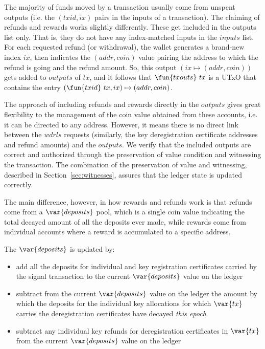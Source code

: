 \documentclass[11pt,a4paper,dvipsnames]{article}
\theoremstyle{definition}
\theoremstyle{definition}
\begin{document}
The majority of funds moved by a transaction usually come from unspent outputs
(i.e. the $(txid, ix)$ pairs in the inputs of a transaction). The claiming of
refunds and rewards works slightly differently. These get included in the outputs list
only. That is, they do not have any index-matched inputs in the $inputs$ list.
For each requested refund (or withdrawal), the
wallet generates a brand-new index $ix$, then indicates the $(addr,coin)$ value
pairing the address to which the refund is going and the refund amount.
So, this output $(ix \mapsto (addr,coin))$ gets added to $outputs$ of $tx$,
and it follows that $\fun{txouts}~{tx}$ is a UTxO that contains the entry
$(\fun{txid}~{tx}, ix) \mapsto (addr,coin)$.

The approach of including refunds and rewards directly in the $outputs$ gives
great flexibility to the management of the coin value obtained from these
accounts, i.e. it can be directed to any address. However, it means there is no
direct link between the $wdrls$ requests (similarly, the key deregistration
certificate addresses and refund amounts) and the $outputs$. We verify that
the included outputs are correct and authorized through the preservation of value condition
and witnessing the transaction. The combination of the
preservation of value and witnessing, described in Section~\ref{sec:witnesses},
assures that the ledger state is updated correctly.

The main difference, however, in how rewards and refunds work is that refunds
come from a $\var{deposits}$ pool, which is a single coin value indicating
the total decayed amount of all the deposits ever made, while rewards come from individual
accounts where a reward is accumulated to a specific address.

The $\var{deposits}$ is updated by:

\begin{itemize}
\item add all the deposits for individual and key registration certificates
carried by the signal transaction to the current $\var{deposits}$ value on the ledger
\item subtract from the current $\var{deposits}$ value on the ledger
the amount by which the deposits for the individual key allocations
for which $\var{tx}$ carries the deregistration certificates have
decayed \textit{this epoch}
\item subtract any individual key refunds for deregistration certificates
in $\var{tx}$ from the current $\var{deposits}$ value on the ledger
\end{itemize}
\end{document}
